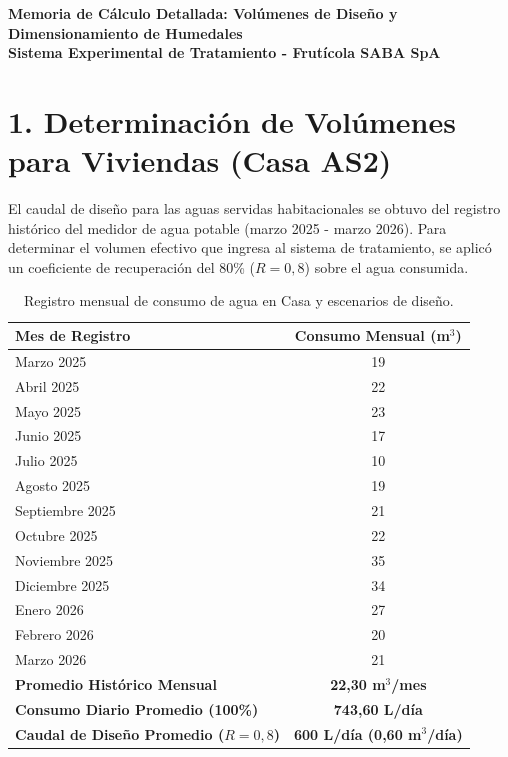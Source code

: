\documentclass[12pt]{article}
\begin{document}
\begin{center}
    \Large\textbf{Memoria de Cálculo Detallada: Volúmenes de Diseño y Dimensionamiento de Humedales} \\[0.3em]
    \large\textbf{Sistema Experimental de Tratamiento - Frutícola SABA SpA}
\end{center}

\vspace{1.5em}

\section*{1. Determinación de Volúmenes para Viviendas (Casa AS2)}
El caudal de diseño para las aguas servidas habitacionales se obtuvo del registro histórico del medidor de agua potable (marzo 2025 - marzo 2026). Para determinar el volumen efectivo que ingresa al sistema de tratamiento, se aplicó un coeficiente de recuperación del 80\% ($R = 0,8$) sobre el agua consumida.

\begin{table}[H]
    \centering
    \caption{Registro mensual de consumo de agua en Casa y escenarios de diseño.}
    \vspace{0.5em}
    \begin{tabular}{>{\raggedright\arraybackslash}p{7cm} c}
        \toprule
        \textbf{Mes de Registro} & \textbf{Consumo Mensual (m$^3$)} \\
        \midrule
        Marzo 2025 & 19 \\
        Abril 2025 & 22 \\
        Mayo 2025 & 23 \\
        Junio 2025 & 17 \\
        Julio 2025 & 10 \\
        Agosto 2025 & 19 \\
        Septiembre 2025 & 21 \\
        Octubre 2025 & 22 \\
        Noviembre 2025 & 35 \\
        Diciembre 2025 & 34 \\
        Enero 2026 & 27 \\
        Febrero 2026 & 20 \\
        Marzo 2026 & 21 \\
        \midrule
        \textbf{Promedio Histórico Mensual} & \textbf{22,30 m$^3$/mes} \\
        \textbf{Consumo Diario Promedio (100\%)} & \textbf{743,60 L/día} \\
        \midrule
        \textbf{Caudal de Diseño Promedio ($R=0,8$)} & \textbf{600 L/día (0,60 m$^3$/día)} \\
        \bottomrule
    \end{tabular}
\end{table}
\end{document}
